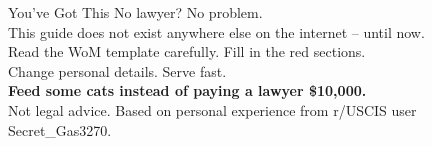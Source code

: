\documentclass[10pt,aspectratio=169]{beamer}
\begin{document}
	\begin{frame}{You’ve Got This}
		\centering
		\vspace{1cm}
		{\Large \textcolor{successgreen}{No lawyer? No problem.}}\\
		\vspace{0.5cm}
		This guide does not exist anywhere else on the internet – until now.\\
		\vspace{0.5cm}
		Read the WoM template carefully. Fill in the red sections.\\
		Change personal details. Serve fast.\\
		\vspace{0.5cm}
		\textcolor{titleblue}{\textbf{Feed some cats instead of paying a lawyer \$10,000.}}\\
		\vspace{0.8cm}
		\tiny Not legal advice. Based on personal experience from r/USCIS user Secret\_Gas3270.
	\end{frame}
	
\end{document}
